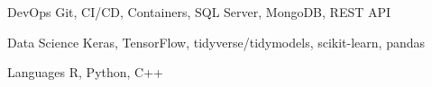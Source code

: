 

\begin{cvskills}

  \cvskill
    {DevOps} %
    {Git, CI/CD, Containers, SQL Server, MongoDB, REST API} %
    
  \cvskill
    {Data Science} %
    {Keras, TensorFlow, tidyverse/tidymodels, scikit-learn, pandas} %

  \cvskill
    {Languages} %
    {R, Python, C++} %

\end{cvskills}
